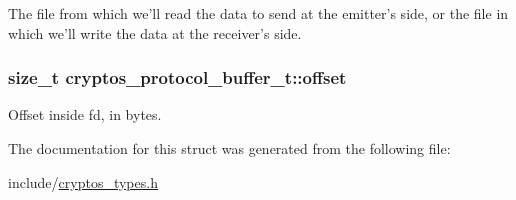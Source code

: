 \label{structcryptos__protocol__buffer__t_a63a8f5b70415ffa8c59dcd7b783398c8}
The file from which we'll read the data to send at the emitter's side, or the file in which we'll write the data at the receiver's side. \hypertarget{structcryptos__protocol__buffer__t_abfbda774fe7657594b8ccc1a17f32d15}{
\subsubsection[{offset}]{\setlength{\rightskip}{0pt plus 5cm}size\_\-t {\bf cryptos\_\-protocol\_\-buffer\_\-t::offset}}}
\label{structcryptos__protocol__buffer__t_abfbda774fe7657594b8ccc1a17f32d15}
Offset inside fd, in bytes. 

The documentation for this struct was generated from the following file:\begin{DoxyCompactItemize}
\item 
include/\hyperlink{cryptos__types_8h}{cryptos\_\-types.h}\end{DoxyCompactItemize}
